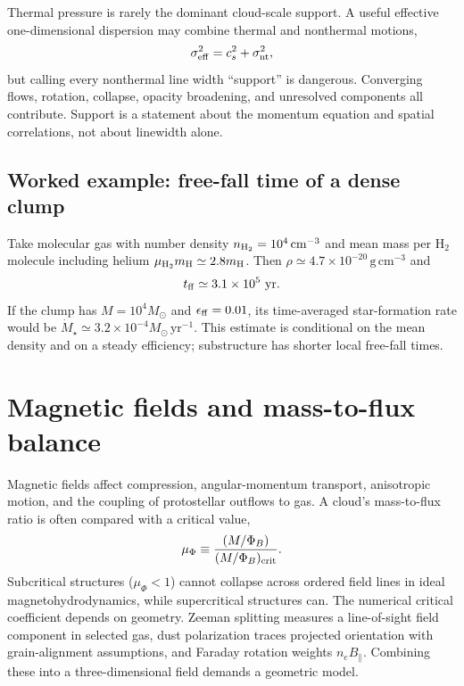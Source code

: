 Thermal pressure is rarely the dominant cloud-scale support.  A useful effective
one-dimensional dispersion may combine thermal and nonthermal motions,
\begin{equation}
 \sigma_{\rm eff}^2=c_s^2+\sigma_{\rm nt}^2,
 \label{eq:effective-dispersion}
\end{equation}
but calling every nonthermal line width ``support'' is dangerous.  Converging flows,
rotation, collapse, opacity broadening, and unresolved components all contribute.
Support is a statement about the momentum equation and spatial correlations, not
about linewidth alone.

\subsection{Worked example: free-fall time of a dense clump}

Take molecular gas with number density
$n_{\rm H_2}=10^4\,\mathrm{cm^{-3}}$ and mean mass per H$_2$ molecule including helium
$\mu_{\rm H_2}m_{\rm H}\simeq2.8m_{\rm H}$.  Then
$\rho\simeq4.7\times10^{-20}\,\mathrm{g\,cm^{-3}}$ and
\begin{equation}
 t_{\rm ff}\simeq3.1\times10^5~\mathrm{yr}.
\end{equation}
If the clump has $M=10^4M_\odot$ and
$\epsilon_{\rm ff}=0.01$, its time-averaged star-formation rate would be
$\dot M_\star\simeq3.2\times10^{-4}M_\odot\,\mathrm{yr^{-1}}$.  This estimate is
conditional on the mean density and on a steady efficiency; substructure has shorter
local free-fall times.

\section{Magnetic fields and mass-to-flux balance}

Magnetic fields affect compression, angular-momentum transport, anisotropic motion,
and the coupling of protostellar outflows to gas.  A cloud's mass-to-flux ratio is
often compared with a critical value,
\begin{equation}
 \mu_\Phi\equiv\frac{(M/\Phi_B)}{(M/\Phi_B)_{\rm crit}}.
 \label{eq:mass-to-flux}
\end{equation}
Subcritical structures ($\mu_\Phi<1$) cannot collapse across ordered field lines in
ideal magnetohydrodynamics, while supercritical structures can.  The numerical
critical coefficient depends on geometry.  Zeeman splitting measures a line-of-sight
field component in selected gas, dust polarization traces projected orientation with
grain-alignment assumptions, and Faraday rotation weights $n_eB_\parallel$.  Combining
these into a three-dimensional field demands a geometric model.

